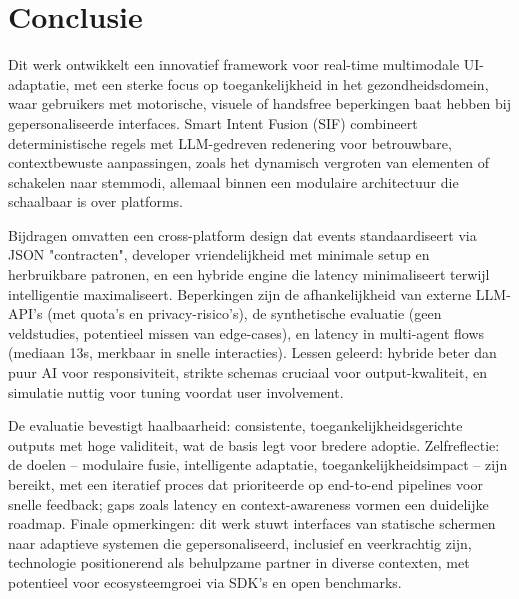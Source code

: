 \documentclass[openany]{book}
\begin{document}
\section*{Conclusie}
Dit werk ontwikkelt een innovatief framework voor real-time multimodale UI-adaptatie, met een sterke focus op toegankelijkheid in het gezondheidsdomein, waar gebruikers met motorische, visuele of handsfree beperkingen baat hebben bij gepersonaliseerde interfaces. Smart Intent Fusion (SIF) combineert deterministische regels met LLM-gedreven redenering voor betrouwbare, contextbewuste aanpassingen, zoals het dynamisch vergroten van elementen of schakelen naar stemmodi, allemaal binnen een modulaire architectuur die schaalbaar is over platforms.

Bijdragen omvatten een cross-platform design dat events standaardiseert via JSON "contracten", developer vriendelijkheid met minimale setup en herbruikbare patronen, en een hybride engine die latency minimaliseert terwijl intelligentie maximaliseert. Beperkingen zijn de afhankelijkheid van externe LLM-API's (met quota's en privacy-risico's), de synthetische evaluatie (geen veldstudies, potentieel missen van edge-cases), en latency in multi-agent flows (mediaan 13s, merkbaar in snelle interacties). Lessen geleerd: hybride beter dan puur AI voor responsiviteit, strikte schemas cruciaal voor output-kwaliteit, en simulatie nuttig voor tuning voordat user involvement.

De evaluatie bevestigt haalbaarheid: consistente, toegankelijkheidsgerichte outputs met hoge validiteit, wat de basis legt voor bredere adoptie. Zelfreflectie: de doelen – modulaire fusie, intelligente adaptatie, toegankelijkheidsimpact – zijn bereikt, met een iteratief proces dat prioriteerde op end-to-end pipelines voor snelle feedback; gaps zoals latency en context-awareness vormen een duidelijke roadmap. Finale opmerkingen: dit werk stuwt interfaces van statische schermen naar adaptieve systemen die gepersonaliseerd, inclusief en veerkrachtig zijn, technologie positionerend als behulpzame partner in diverse contexten, met potentieel voor ecosysteemgroei via SDK's en open benchmarks.

\tableofcontents
\listoffigures
\listoftables

















\printbibliography[title=References]
\end{document}
